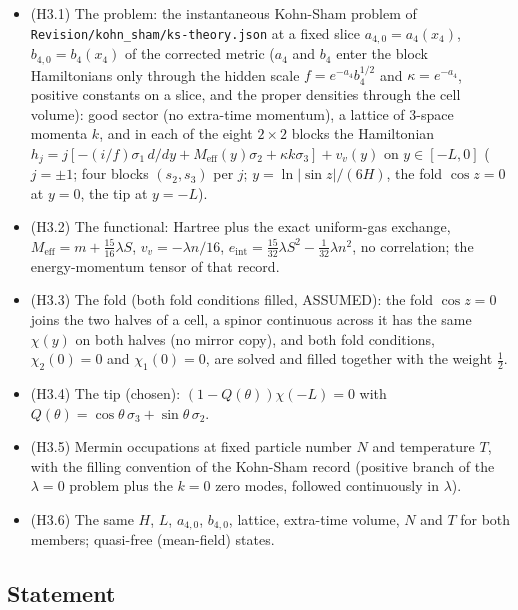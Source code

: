 \documentclass[11pt]{article}
\begin{document}
\begin{itemize}
\item (H3.1) The problem: the instantaneous Kohn-Sham problem of \texttt{Revision\allowbreak{}/kohn\_sh\allowbreak{}am/ks-th\allowbreak{}eory.jso\allowbreak{}n} at a fixed slice $a_{4,0} = a_4(x_4)$, $b_{4,0} = b_4(x_4)$ of the corrected metric ($a_4$ and $b_4$ enter the block Hamiltonians only through the hidden scale $f = e^{-a_4}b_4^{1/2}$ and $\kappa = e^{-a_4}$, positive constants on a slice, and the proper densities through the cell volume): good sector (no extra-time momentum), a lattice of 3-space momenta $k$, and in each of the eight $2 \times 2$ blocks the Hamiltonian $h_j = j[-(i/f)\sigma_1\,d/dy + M_{\mathrm{eff}}(y)\sigma_2 + \kappa k\sigma_3] + v_v(y)$ on $y \in [-L, 0]$ ($j = \pm1$; four blocks $(s_2, s_3)$ per $j$; $y = \ln|\sin z|/(6H)$, the fold $\cos z = 0$ at $y = 0$, the tip at $y = -L$).
\item (H3.2) The functional: Hartree plus the exact uniform-gas exchange, $M_{\mathrm{eff}} = m + \frac{15}{16}\lambda S$, $v_v = -\lambda n/16$, $e_{\mathrm{int}} = \frac{15}{32}\lambda S^2 - \frac{1}{32}\lambda n^2$, no correlation; the energy-momentum tensor of that record.
\item (H3.3) The fold (both fold conditions filled, ASSUMED): the fold $\cos z = 0$ joins the two halves of a cell, a spinor continuous across it has the same $\chi(y)$ on both halves (no mirror copy), and both fold conditions, $\chi_2(0) = 0$ and $\chi_1(0) = 0$, are solved and filled together with the weight $\frac12$.
\item (H3.4) The tip (chosen): $(1 - Q(\theta))\chi(-L) = 0$ with $Q(\theta) = \cos\theta\,\sigma_3 + \sin\theta\,\sigma_2$.
\item (H3.5) Mermin occupations at fixed particle number $N$ and temperature $T$, with the filling convention of the Kohn-Sham record (positive branch of the $\lambda = 0$ problem plus the $k = 0$ zero modes, followed continuously in $\lambda$).
\item (H3.6) The same $H$, $L$, $a_{4,0}$, $b_{4,0}$, lattice, extra-time volume, $N$ and $T$ for both members; quasi-free (mean-field) states.
\end{itemize}

\subsection{Statement}
\end{document}

